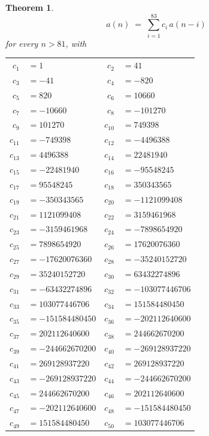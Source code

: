 \documentclass[11pt,a4paper]{article}
\theoremstyle{plain}
\newtheorem{theorem}{Theorem}
\theoremstyle{definition}
\begin{document}
\begin{theorem}
\[
a(n)\;=\;\sum_{i=1}^{83}c_i\,a(n-i)
\]
for every $n>81$, with
\begin{center}\footnotesize
\begin{tabular}{r@{\,}l@{\qquad}r@{\,}l}
$c_{1}$ & $=1$ & $c_{2}$ & $=41$ \\
$c_{3}$ & $=-41$ & $c_{4}$ & $=-820$ \\
$c_{5}$ & $=820$ & $c_{6}$ & $=10660$ \\
$c_{7}$ & $=-10660$ & $c_{8}$ & $=-101270$ \\
$c_{9}$ & $=101270$ & $c_{10}$ & $=749398$ \\
$c_{11}$ & $=-749398$ & $c_{12}$ & $=-4496388$ \\
$c_{13}$ & $=4496388$ & $c_{14}$ & $=22481940$ \\
$c_{15}$ & $=-22481940$ & $c_{16}$ & $=-95548245$ \\
$c_{17}$ & $=95548245$ & $c_{18}$ & $=350343565$ \\
$c_{19}$ & $=-350343565$ & $c_{20}$ & $=-1121099408$ \\
$c_{21}$ & $=1121099408$ & $c_{22}$ & $=3159461968$ \\
$c_{23}$ & $=-3159461968$ & $c_{24}$ & $=-7898654920$ \\
$c_{25}$ & $=7898654920$ & $c_{26}$ & $=17620076360$ \\
$c_{27}$ & $=-17620076360$ & $c_{28}$ & $=-35240152720$ \\
$c_{29}$ & $=35240152720$ & $c_{30}$ & $=63432274896$ \\
$c_{31}$ & $=-63432274896$ & $c_{32}$ & $=-103077446706$ \\
$c_{33}$ & $=103077446706$ & $c_{34}$ & $=151584480450$ \\
$c_{35}$ & $=-151584480450$ & $c_{36}$ & $=-202112640600$ \\
$c_{37}$ & $=202112640600$ & $c_{38}$ & $=244662670200$ \\
$c_{39}$ & $=-244662670200$ & $c_{40}$ & $=-269128937220$ \\
$c_{41}$ & $=269128937220$ & $c_{42}$ & $=269128937220$ \\
$c_{43}$ & $=-269128937220$ & $c_{44}$ & $=-244662670200$ \\
$c_{45}$ & $=244662670200$ & $c_{46}$ & $=202112640600$ \\
$c_{47}$ & $=-202112640600$ & $c_{48}$ & $=-151584480450$ \\
$c_{49}$ & $=151584480450$ & $c_{50}$ & $=103077446706$ \\

\end{tabular}
\end{center}
\end{theorem}
\end{document}
